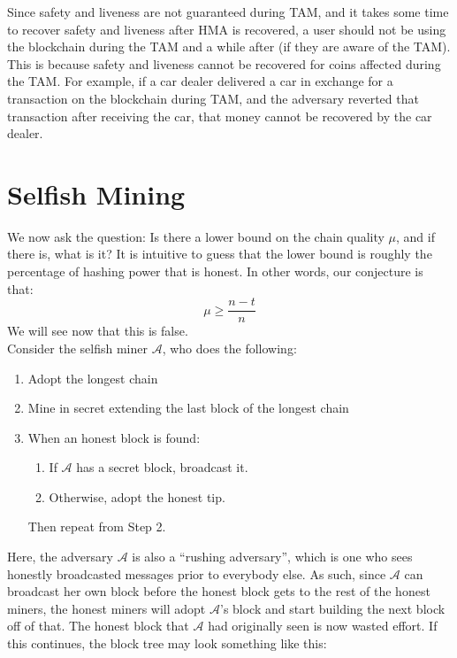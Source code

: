 Since safety and liveness are not guaranteed during TAM, and it takes some time to recover safety and liveness after HMA is recovered, a user should not be using the blockchain during the TAM and a while after (if they are aware of the TAM). This is because safety and liveness cannot be recovered for coins affected during the TAM.
For example, if a car dealer delivered a car in exchange for a transaction on the blockchain during TAM, and the adversary reverted that transaction after receiving the car, that money cannot be recovered by the car dealer.


\section{Selfish Mining}
We now ask the question: Is there a lower bound on the chain quality $\mu$, and if there is, what is it? It is intuitive to guess that the lower bound is roughly the percentage of hashing power that is honest. In other words, our conjecture is that:
\begin{equation}
\label{eq:cq_conjecture}
    \mu \geq \frac{n-t}{n}
\end{equation}
We will see now that this is false. \\
Consider the selfish miner $\mathcal{A}$, who does the following:
\begin{enumerate}
    \item Adopt the longest chain
    \item Mine in secret extending the last block of the longest chain
    \item When an honest block is found:
    \begin{enumerate}
        \item If $\mathcal{A}$ has a secret block, broadcast it.
        \item Otherwise, adopt the honest tip.
    \end{enumerate}
    Then repeat from Step 2.
\end{enumerate}


Here, the adversary $\mathcal{A}$ is also a “rushing adversary”, which is one who sees honestly broadcasted messages prior to everybody else. As such, since $\mathcal{A}$ can broadcast her own block before the honest block gets to the rest of the honest miners, the honest miners will adopt $\mathcal{A}$'s block and start building the next block off of that. The honest block that $\mathcal{A}$ had originally seen is now wasted effort. If this continues, the block tree may look something like this:

